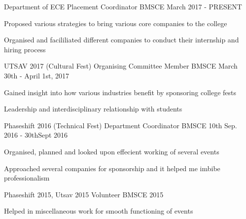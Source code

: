 \begin{cventries}
  \cventry
    {Department of ECE}
    {Placement Coordinator}
    {BMSCE}
    {March 2017 - PRESENT}
    {
      \begin{cvitems}
        \item {Proposed various strategies to bring various core companies to the college}
        \item {Organised and facililiated different companies to conduct their internship and hiring process}
      \end{cvitems}
    }
    \cventry
    {UTSAV 2017 (Cultural Fest)}
    {Organising Committee Member}
    {BMSCE}
    {March 30th - April 1st, 2017}
    {
      \begin{cvitems}
        \item {Gained insight into how various industries benefit by sponsoring college fests}
         \item {Leadership and interdisciplinary relationship with students}
      \end{cvitems}
    }
  \cventry
    {Phaseshift 2016 (Technical Fest)}
    {Department Coordinator}
    {BMSCE}
    {10th Sep. 2016 - 30thSept 2016}
    {
      \begin{cvitems}
        \item {Organised, planned and looked upon effecient working of several events}
        \item {Approached several companies for sponsorship and it helped me imbibe professionalism}
      \end{cvitems}
    }
     \cventry
    {Phaseshift 2015, Utsav 2015}
    {Volunteer}
    {BMSCE}
    {2015}
    {
      \begin{cvitems}
        \item {Helped in miscellaneous work for smooth functioning of events}
      \end{cvitems}
    }
  
\end{cventries}
